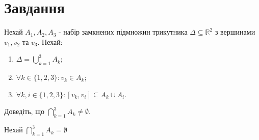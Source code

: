
\chapter{Завдання \theHchapter}

\begin{tcolorbox}[title=Завдання]
    Нехай $A_{1}, A_{2}, A_{3}$ - набір замкнених підмножин трикутника 
    $\Delta \subseteq \mathbb{R}^{2}$ з вершинами 
    $v_{1}, v_{2}$ та $v_{3}$. 
    Нехай:
    \begin{enumerate}
    \item $\Delta=\bigcup_{k=1}^{3} A_{k}$;

    \item $\forall k \in\{1,2,3\}: v_{k} \in A_{k}$;

    \item $\forall k, i \in\{1,2,3\}:\left[v_{k}, v_{i}\right] \subseteq A_{k} \cup A_{i}$.

    \end{enumerate}

    Доведіть, що $\bigcap_{k=1}^{3} A_{k} \neq \emptyset$.


\end{tcolorbox}


Нехай $\bigcap_{k=1}^{3} A_{k} = \emptyset$ 
